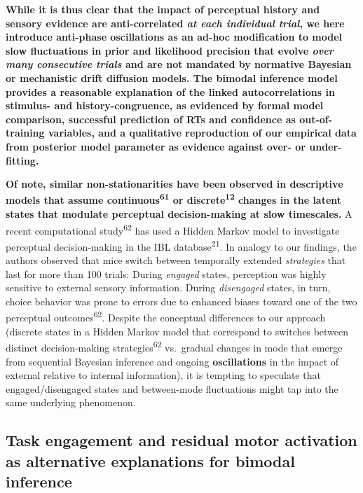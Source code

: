 \documentclass[
]{article}
\begin{document}
\textbf{While it is thus clear that the impact of perceptual history and
sensory evidence are anti-correlated \emph{at each individual trial}, we
here introduce anti-phase oscillations as an ad-hoc modification to
model slow fluctuations in prior and likelihood precision that evolve
\emph{over many consecutive trials} and are not mandated by normative
Bayesian or mechanistic drift diffusion models. The bimodal inference
model provides a reasonable explanation of the linked autocorrelations
in stimulus- and history-congruence, as evidenced by formal model
comparison, successful prediction of RTs and confidence as
out-of-training variables, and a qualitative reproduction of our
empirical data from posterior model parameter as evidence against over-
or under-fitting.}

\textbf{Of note, similar non-stationarities have been observed in
descriptive models that assume continuous\textsuperscript{61} or
discrete\textsuperscript{12} changes in the latent states that modulate
perceptual decision-making at slow timescales.} A recent computational
study\textsuperscript{62} has used a Hidden Markov model to investigate
perceptual decision-making in the IBL database\textsuperscript{21}. In
analogy to our findings, the authors observed that mice switch between
temporally extended \emph{strategies} that last for more than 100
trials: During \emph{engaged} states, perception was highly sensitive to
external sensory information. During \emph{disengaged} states, in turn,
choice behavior was prone to errors due to enhanced biases toward one of
the two perceptual outcomes\textsuperscript{62}. Despite the conceptual
differences to our approach (discrete states in a Hidden Markov model
that correspond to switches between distinct decision-making
strategies\textsuperscript{62} vs.~gradual changes in mode that emerge
from sequential Bayesian inference and ongoing \textbf{oscillations} in
the impact of external relative to internal information), it is tempting
to speculate that engaged/disengaged states and between-mode
fluctuations might tap into the same underlying phenomenon.

\hypertarget{task-engagement-and-residual-motor-activation-as-alternative-explanations-for-bimodal-inference}{%
\subsection{Task engagement and residual motor activation as alternative
explanations for bimodal
inference}\label{task-engagement-and-residual-motor-activation-as-alternative-explanations-for-bimodal-inference}}
\end{document}
